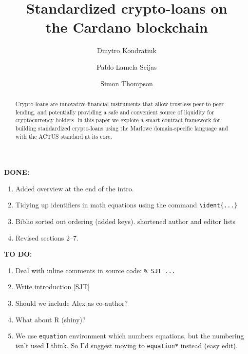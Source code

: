\documentclass[runningheads]{llncs}
\newcommand{\ident}[1]{\mbox{\emph{#1}}}
\begin{document}
\title{Standardized crypto-loans on\\ the Cardano blockchain}%


\author{Dmytro Kondratiuk \and
				Pablo {Lamela Seijas} \and
                Simon Thompson}





%
\maketitle              %
%
\begin{abstract}
Crypto-loans are %
innovative financial instruments that
allow trustless peer-to-peer %
lending, and potentially providing a safe and convenient
source of liquidity for cryptocurrency holders. In this paper we
explore a smart contract framework for building standardized crypto-loans
using the Marlowe domain-specific language and with the ACTUS standard at its core.

\end{abstract}


\textbf{DONE:}
\begin{enumerate}
\item
Added overview at the end of the intro.
\item
Tidying up identifiers in math equations using the command \verb+\ident{...}+
\item
Biblio sorted out ordering (added keys). shortened author and editor lists
\item
Revised sections 2--7.
\end{enumerate}

\textbf{TO DO:}
\begin{enumerate}
\item
Deal with inline comments in source code: \verb+% SJT ...+
\item
Write introduction [SJT]
\item
Should we include Alex as co-author?
\item
What about R (shiny)?
\item
We use \verb+equation+ environment which numbers equations, but the numbering isn't used I think.
So I'd suggest moving to \verb+equation*+ instead (easy edit).
\end{enumerate}
\end{document}
